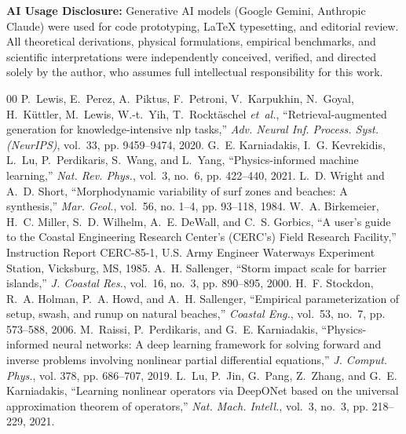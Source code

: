 \documentclass[journal]{IEEEtran}
\begin{document}
\vspace{0.5em}
\noindent\textbf{AI Usage Disclosure:} \footnotesize Generative AI models (Google Gemini, Anthropic Claude) were used for code prototyping, LaTeX typesetting, and editorial review. All theoretical derivations, physical formulations, empirical benchmarks, and scientific interpretations were independently conceived, verified, and directed solely by the author, who assumes full intellectual responsibility for this work.\normalsize

\begin{thebibliography}{00}
\fontsize{7.6pt}{8.8pt}\selectfont
\setlength{\itemsep}{-0.6pt plus 0.1pt}
\setlength{\parskip}{0pt}
 P.~Lewis, E.~Perez, A.~Piktus, F.~Petroni, V.~Karpukhin, N.~Goyal, H.~K{\"u}ttler, M.~Lewis, W.-t.~Yih, T.~Rockt{\"a}schel \textit{et~al.}, ``Retrieval-augmented generation for knowledge-intensive nlp tasks,'' \textit{Adv. Neural Inf. Process. Syst. (NeurIPS)}, vol.~33, pp. 9459--9474, 2020.
 G.~E. Karniadakis, I.~G. Kevrekidis, L.~Lu, P.~Perdikaris, S.~Wang, and L.~Yang, ``Physics-informed machine learning,'' \textit{Nat. Rev. Phys.}, vol.~3, no.~6, pp. 422--440, 2021.
 L.~D. Wright and A.~D. Short, ``Morphodynamic variability of surf zones and beaches: A synthesis,'' \textit{Mar. Geol.}, vol.~56, no. 1--4, pp. 93--118, 1984.
 W.~A. Birkemeier, H.~C. Miller, S.~D. Wilhelm, A.~E. DeWall, and C.~S. Gorbics, ``A user's guide to the Coastal Engineering Research Center's (CERC's) Field Research Facility,'' Instruction Report CERC-85-1, U.S. Army Engineer Waterways Experiment Station, Vicksburg, MS, 1985.
 A.~H. Sallenger, ``Storm impact scale for barrier islands,'' \textit{J. Coastal Res.}, vol.~16, no.~3, pp. 890--895, 2000.
 H.~F. Stockdon, R.~A. Holman, P.~A. Howd, and A.~H. Sallenger, ``Empirical parameterization of setup, swash, and runup on natural beaches,'' \textit{Coastal Eng.}, vol.~53, no.~7, pp. 573--588, 2006.
 M.~Raissi, P.~Perdikaris, and G.~E. Karniadakis, ``Physics-informed neural networks: A deep learning framework for solving forward and inverse problems involving nonlinear partial differential equations,'' \textit{J. Comput. Phys.}, vol. 378, pp. 686--707, 2019.
 L.~Lu, P.~Jin, G.~Pang, Z.~Zhang, and G.~E. Karniadakis, ``Learning nonlinear operators via DeepONet based on the universal approximation theorem of operators,'' \textit{Nat. Mach. Intell.}, vol.~3, no.~3, pp. 218--229, 2021.

\end{thebibliography}
\end{document}

